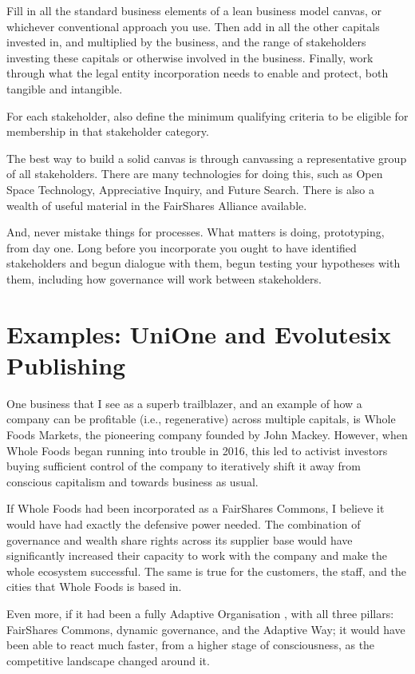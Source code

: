 Fill in all the standard business elements of a lean business model canvas, or whichever conventional approach you use. Then add in all the other capitals invested in, and multiplied by the business, and the range of stakeholders investing these capitals or otherwise involved in the business. Finally, work through what the legal entity incorporation needs to enable and protect, both tangible and intangible. 


For each stakeholder, also define the minimum qualifying criteria to be eligible for membership in that stakeholder category. 


The best way to build a solid canvas is through canvassing a representative group of all stakeholders. There are many technologies for doing this, such as Open Space Technology, Appreciative Inquiry, and Future Search. There is also a wealth of useful material in the FairShares Alliance available.


And, never mistake things for processes. What matters is doing, prototyping, from day one. Long before you incorporate you ought to have identified stakeholders and begun dialogue with them, begun testing your hypotheses with them, including how governance will work between stakeholders. 
\section{Examples: UniOne and Evolutesix Publishing}
One business that I see as a superb trailblazer, and an example of how a company can be profitable (i.e., regenerative) across multiple capitals, is Whole Foods Markets, the pioneering company founded by John Mackey. However, when Whole Foods  began running into trouble in 2016\cite{guardian-whole-foods}, this led to activist investors buying sufficient control of the company to iteratively shift it away from conscious capitalism and towards business as usual.


If Whole Foods had been incorporated as a FairShares Commons, I believe it would have had exactly the defensive power needed. The combination of governance and wealth share rights across its supplier base would have significantly increased their capacity to work with the company and make the whole ecosystem successful. The same is true for the customers, the staff, and the cities that Whole Foods is based in.


Even more, if it had been a fully Adaptive Organisation , with all three pillars: FairShares Commons, dynamic governance, and the Adaptive Way; it would have been able to react much faster, from a higher stage of consciousness, as the competitive landscape changed around it.


